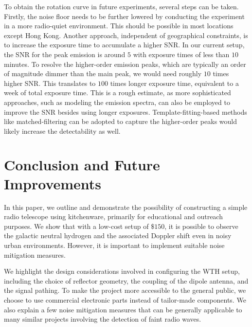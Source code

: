 \documentclass[12pt]{article}
\begin{document}
    To obtain the rotation curve in future experiments, several steps can be taken. Firstly, the noise floor needs to be further lowered by conducting the experiment in a more radio-quiet environment. This should be possible in most locations except Hong Kong. Another approach, independent of geographical constraints, is to increase the exposure time to accumulate a higher SNR. 
    In our current setup, the SNR for the peak emission is around $5$ with exposure times of less than $10$ minutes. 
    To resolve the higher-order emission peaks, which are typically an order of magnitude dimmer than the main peak, we would need roughly $10$ times higher SNR. 
    This translates to $100$ times longer exposure time, equivalent to a week of total exposure time. This is a rough estimate, as more sophisticated approaches, such as modeling the emission spectra, can also be employed to improve the SNR besides using longer exposures. 
    Template-fitting-based methods like matched-filtering can be adopted to capture the higher-order peaks would likely increase the detectability as well.
    
    \section{Conclusion and Future Improvements} \label{sect: conclusion}
    In this paper, we outline and demonstrate the possibility of constructing a simple radio telescope using kitchenware, primarily for educational and outreach purposes. We show that with a low-cost setup of $\$150$, it is possible to observe the galactic neutral hydrogen and the associated Doppler shift even in noisy urban environments. 
    However, it is important to implement suitable noise mitigation measures.

    We highlight the design considerations involved in configuring the WTH setup, including the choice of reflector geometry, the coupling of the dipole antenna, and the signal pathing. 
    To make the project more accessible to the general public, we choose to use commercial electronic parts instead of tailor-made components. 
    We also explain a few noise mitigation measures that can be generally applicable to many similar projects involving the detection of faint radio waves.
    
\end{document}
